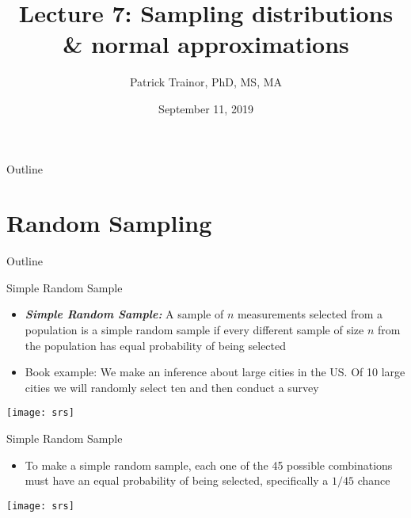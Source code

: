 \documentclass[xcolor=dvipsnames]{beamer}
\title[Lecture 7]{Lecture 7: Sampling distributions \& normal approximations}
\author[Patrick Trainor]{Patrick Trainor, PhD, MS, MA}
\institute[NMSU]{New Mexico State University}
\date{September 11, 2019}
\begin{document}
	
\begin{frame}
	\maketitle
\end{frame}

\begin{frame}{Outline}
	\tableofcontents[hideallsubsections]
\end{frame}

\section{Random Sampling}
\begin{frame}{Outline}
	\tableofcontents[currentsection,subsectionstyle=show/shaded/hide]
\end{frame}

\begin{frame}{Simple Random Sample}
	\begin{itemize}
		\item \textbf{\emph{Simple Random Sample:}} A sample of $n$ measurements selected from a population is a simple random sample if every different sample of size $n$ from the population has equal probability of being selected
		\item Book example: We make an inference about large cities in the US. Of 10 large cities we will randomly select ten and then conduct a survey
	\end{itemize}
	\begin{center}
		\texttt{[image: srs]}
	\end{center}
\end{frame}

\begin{frame}{Simple Random Sample}
	\begin{itemize}
		\item To make a simple random sample, each one of the 45 possible combinations must have an equal probability of being selected, specifically a $1/45$ chance
	\end{itemize}
	\begin{center}
		\texttt{[image: srs]}
	\end{center}
\end{frame}
\end{document}
